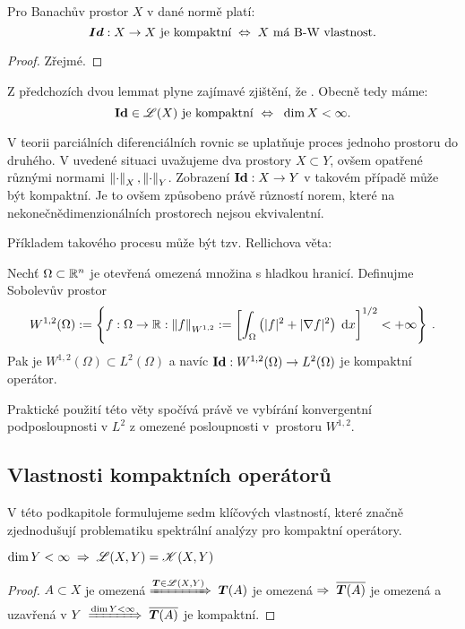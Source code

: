 \begin{lemma} \label{3.kompaktnost identity}
Pro Banachův prostor $X$ v dané normě platí:
$$\boldsymbol{Id} : X \to X \text{ je kompaktní}\;\Leftrightarrow\;X \text{ má B-W vlastnost}.$$
\end{lemma}
\begin{proof}
Zřejmé.
\end{proof}

Z předchozích dvou lemmat plyne zajímavé zjištění, že . Obecně tedy máme:
$$\boldsymbol{\mathrm{Id}}\in\mathscr{L}(X) \text{ je kompaktní }\Leftrightarrow\;\; \dim X<\infty.$$


\begin{remark}
V teorii parciálních diferenciálních rovnic se uplatňuje proces  jednoho prostoru do druhého. V uvedené situaci uvažujeme dva prostory $ X \subset Y$, ovšem opatřené různými normami $\left\lVert\cdot\right\rVert_X, \left\lVert\cdot\right\rVert_Y$. Zobrazení $\boldsymbol{\mathrm{Id}} : X \to Y$ v takovém případě může být kompaktní. Je to ovšem způsobeno právě růzností norem, které na nekonečnědimenzionálních prostorech nejsou ekvivalentní.

Příkladem takového procesu může být tzv. Rellichova věta:

Nechť $\Omega \subset \mathbb{R}^n$ je otevřená omezená množina s hladkou hranicí. Definujme Sobolevův prostor \begin{align*}
    W^{1,2}(\Omega) := \left \lbrace f: \Omega \to \mathbb{R} : \left\lVert f\right\rVert_{W^{1,2}} := \left[ \int_\Omega \left( |f|^2 + |\nabla f|^2 \right) \;\mathrm{d}x \right]^{1/2} < + \infty \right \rbrace \:.
\end{align*}
Pak je $W^{1,2}(\Omega) \subset L^2(\Omega)$ a navíc $\boldsymbol{\mathrm{Id}} : W^{1,2}(\Omega) \to L^2(\Omega)$ je kompaktní operátor.

Praktické použití této věty spočívá právě ve vybírání konvergentní podposloupnosti v $L^2$ z omezené posloupnosti v~prostoru $W^{1,2}$.
\end{remark}

\subsection{Vlastnosti kompaktních operátorů}
V této podkapitole formulujeme sedm klíčových vlastností, které značně zjednodušují problematiku spektrální analýzy pro kompaktní operátory.

\begin{lemma}
    $\dim Y<\infty \;\Rightarrow\; \mathscr{L}(X,Y)=\mathscr{K}(X,Y)$
\end{lemma}
\begin{proof}
$A\subset X$ je omezená$\;\xRightarrow{\boldsymbol{T}\in \mathscr{L}(X,Y)}\;\boldsymbol{T}(A)$ je omezená$\;\Rightarrow\; \overline{\boldsymbol{T}(A)}$ je omezená a uzavřená v $Y\;\xRightarrow{\dim Y<\infty} \; \overline{\boldsymbol{T}(A)}$ je kompaktní.
\end{proof}

